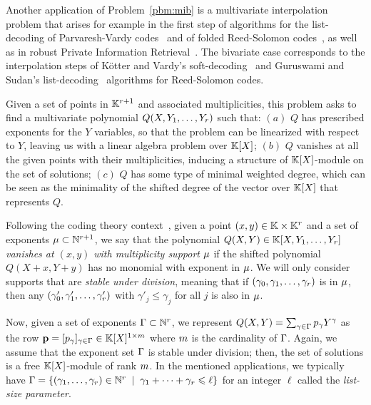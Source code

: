 \documentclass[preprint]{sig-alternate-05-2015}
\begin{document}
Another application of Problem~\ref{pbm:mib} is a multivariate interpolation
problem that arises for example in the first step of algorithms for the
list-decoding of Parvaresh-Vardy codes~\cite{ParVar05} and of folded
Reed-Solomon codes~\cite{GurRud08}, as well as in robust Private Information
Retrieval~\cite{DeGoHe12a}. The bivariate case corresponds to the interpolation
steps of K\"otter and Vardy's soft-decoding~\cite{KoeVar03a} and Guruswami and
Sudan's list-decoding~\cite{GurSud99} algorithms for Reed-Solomon codes.

Given a set of points in $\mathbb{K}^{r+1}$ and associated multiplicities,
this problem asks to find a multivariate polynomial $Q(X,Y_1,\ldots,Y_r)$
such that: $(a)$ $Q$ has prescribed exponents for the $Y$ variables, so that
the problem can be linearized with respect to $Y$, leaving us with a linear
algebra problem over $\mathbb{K}[X]$; $(b)$ $Q$ vanishes at all the given points
with their multiplicities, inducing a structure of $\mathbb{K}[X]$-module on the set
of solutions; $(c)$ $Q$ has some type of minimal weighted degree, which can be
seen as the minimality of the shifted degree of the vector over $\mathbb{K}[X]$ that
represents $Q$.

Following the coding theory context~\cite{GurSud99,ParVar05}, given a point
$(x,y) \in \mathbb{K} \times \mathbb{K}^{r}$ and a set of exponents $\mu \subset
\mathbb{N}^{r+1}$, we say that the polynomial $Q(X,Y) \in
\mathbb{K}[X,Y_1,\ldots,Y_r]$ \emph{vanishes at $(x,y)$ with multiplicity
support $\mu$} if the shifted polynomial $Q(X+x, Y+y)$ has no monomial with
exponent in $\mu$. We will only consider supports that are \emph{stable under
division}, meaning that if $(\gamma_0,\gamma_1,\ldots,\gamma_r)$ is in
$\mu$, then any $(\gamma'_0,\gamma'_1,\ldots,\gamma'_r)$ with $\gamma'_j
\le \gamma_j$ for all $j$ is also in $\mu$. 

Now, given a set of exponents $\Gamma \subset \mathbb{N}^r$, we represent
$Q(X,Y) = \sum_{\gamma \in \Gamma} p_\gamma Y^\gamma$ as the row $\row{p} =
[p_\gamma]_{\gamma \in \expSet} \in \polMatSpace[1][\rdim]$ where $m$ is
the cardinality of $\Gamma$. Again, we assume that the exponent set $\Gamma$
is stable under division; then, the set of solutions is a free
$\mathbb{K}[X]$-module of rank $m$. In the mentioned applications, we typically
have $\Gamma = \{ (\gamma_1,\ldots,\gamma_r) \in \mathbb{N}^r \;\mid\;
\gamma_1 + \cdots + \gamma_r \leqslant \ell\}$ for an integer $\ell$ called the
\emph{list-size parameter}.
\end{document}
